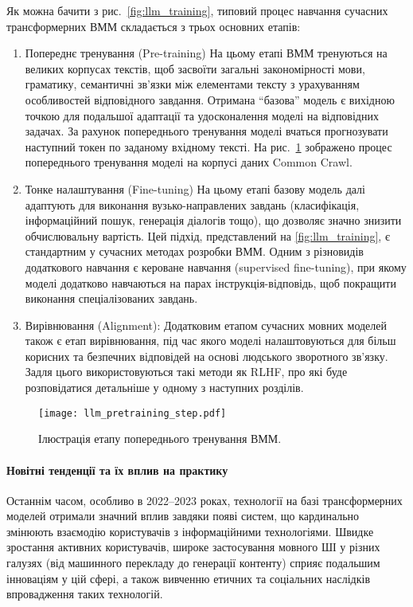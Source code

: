 Як можна бачити з рис.~\ref{fig:llm_training}, типовий процес навчання сучасних трансформерних ВММ \cite{ouyang2022traininglanguagemodelsfollow} складається з трьох основних етапів:

\begin{enumerate}

    \item {Попереднє тренування (Pre-training)}
    На цьому етапі ВММ тренуються на великих корпусах текстів, щоб засвоїти загальні закономірності мови, граматику, семантичні зв’язки між елементами тексту з урахуванням особливостей відповідного завдання. Отримана ``базова'' модель є вихідною точкою для подальшої адаптації та удосконалення моделі на відповідних задачах. За рахунок попереднього тренування моделі вчаться прогнозувати наступний токен по заданому вхідному тексті. На рис.~\ref{fig:pretraining} зображено процес попереднього тренування моделі на корпусі даних Common Crawl.
    
    \item {Тонке налаштування (Fine-tuning)}
    На цьому етапі базову модель далі адаптують для виконання вузько-направлених завдань (класифікація, інформаційний пошук, генерація діалогів тощо), що дозволяє значно знизити обчислювальну вартість. Цей підхід, представлений на \ref{fig:llm_training}, є стандартним у сучасних методах розробки ВММ. Одним з різновидів додаткового навчання є кероване навчання (supervised fine-tuning), при якому моделі додатково навчаються на парах інструкція-відповідь, щоб покращити виконання спеціалізованих завдань.
    
    \item {Вирівнювання (Alignment)}: Додатковим етапом сучасних мовних моделей також є етап вирівнювання, під час якого моделі налаштовуються для більш корисних та безпечних відповідей на основі людського зворотного зв'язку. Задля цього використовуються такі методи як RLHF, про які буде розповідатися детальніше у одному з наступних розділів.
    
\end{enumerate}

\begin{figure}[h]
\centering
\texttt{[image: llm\_pretraining\_step.pdf]}
\caption{Ілюстрація етапу попереднього тренування ВММ.}
\label{fig:pretraining}
\end{figure}

\paragraph{Новітні тенденції та їх вплив на практику}
Останнім часом, особливо в 2022–2023 роках, технології на базі трансформерних моделей отримали значний вплив завдяки появі систем, що кардинально змінюють взаємодію користувачів з інформаційними технологіями. Швидке зростання активних користувачів, широке застосування мовного ШІ у різних галузях (від машинного перекладу до генерації контенту) сприяє подальшим інноваціям у цій сфері, а також вивченню етичних та соціальних наслідків впровадження таких технологій.


